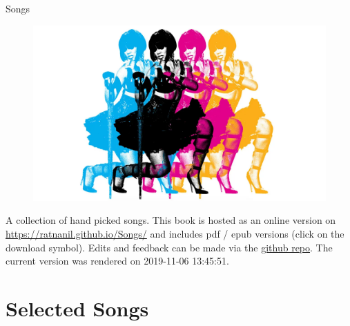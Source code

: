 \documentclass[]{book}
\title{}
\author{}
\date{}
\begin{document}

\begin{titlepage}
\begin{center}
  

\end{center}
\vspace{1.5cm}
\begin{center}

{\LARGE Songs}

\end{center}
 \vspace{1cm}

\begin{figure}[htbp]
  \centering
  \includegraphics[width=1\textwidth]{misc/title.png}
  \label{titelbild}
\end{figure}

\begin{center}
\textbf{}


\end{center} 

\vspace{1.0cm}


\end{titlepage}

{
\setcounter{tocdepth}{1}
\tableofcontents
}
A collection of hand picked songs. This book is hosted as an online version on \url{https://ratnanil.github.io/Songs/} and includes pdf / epub versions (click on the download symbol). Edits and feedback can be made via the \href{https://github.com/ratnanil/songs}{github repo}. The current version was rendered on 2019-11-06 13:45:51.

\hypertarget{selected-songs}{%
\chapter{Selected Songs}\label{selected-songs}}
\end{document}
